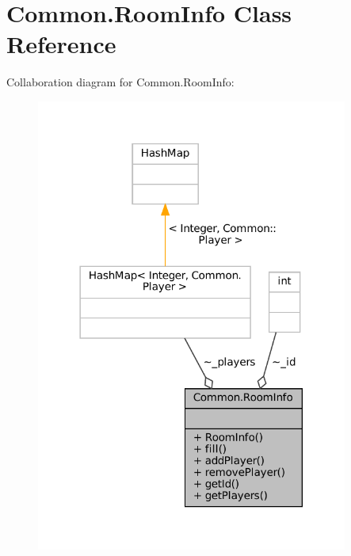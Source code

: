 \hypertarget{classCommon_1_1RoomInfo}{}\section{Common.\+Room\+Info Class Reference}
\label{classCommon_1_1RoomInfo}


Collaboration diagram for Common.\+Room\+Info\+:
\nopagebreak
\begin{figure}[H]
\begin{center}
\leavevmode
\includegraphics[width=290pt]{classCommon_1_1RoomInfo__coll__graph}
\end{center}
\end{figure}
